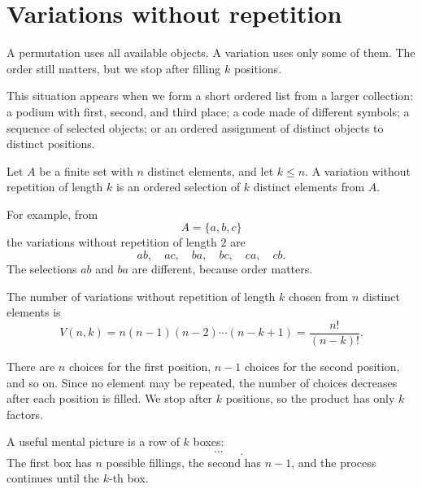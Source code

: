 \section{Variations without repetition}

A permutation uses all available objects. A variation uses only some of them. The order still matters, but we stop after filling \(k\) positions.

This situation appears when we form a short ordered list from a larger collection: a podium with first, second, and third place; a code made of different symbols; a sequence of selected objects; or an ordered assignment of distinct objects to distinct positions.

\begin{definitionbox}
Let \(A\) be a finite set with \(n\) distinct elements, and let \(k\leq n\). A variation without repetition of length \(k\) is an ordered selection of \(k\) distinct elements from \(A\).
\end{definitionbox}

For example, from
\[
A=\{a,b,c\}
\]
the variations without repetition of length \(2\) are
\[
ab,\quad ac,\quad ba,\quad bc,\quad ca,\quad cb.
\]
The selections \(ab\) and \(ba\) are different, because order matters.

\begin{center}
\end{center}

\begin{theorembox}
The number of variations without repetition of length \(k\) chosen from \(n\) distinct elements is
\[
V(n,k)=n(n-1)(n-2)\cdots(n-k+1)=\frac{n!}{(n-k)!}.
\]
\end{theorembox}

There are \(n\) choices for the first position, \(n-1\) choices for the second position, and so on. Since no element may be repeated, the number of choices decreases after each position is filled. We stop after \(k\) positions, so the product has only \(k\) factors.

A useful mental picture is a row of \(k\) boxes:
\[
\boxed{\phantom{a}}\quad \boxed{\phantom{a}}\quad \cdots \quad \boxed{\phantom{a}}.
\]
The first box has \(n\) possible fillings, the second has \(n-1\), and the process continues until the \(k\)-th box.

